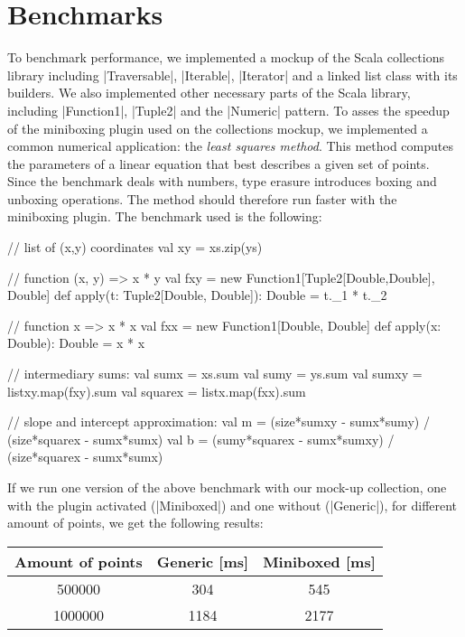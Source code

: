 \section{Benchmarks}

To benchmark performance, we implemented a mockup of the Scala collections library including |Traversable|, |Iterable|, |Iterator| and a linked list class with its builders. We also implemented other necessary parts of the Scala library, including |Function1|, |Tuple2| and the |Numeric| pattern. To asses the speedup of the miniboxing plugin used on the collections mockup, we implemented a common numerical application: the \textit{least squares method}. This method computes the parameters of a linear equation that best describes a given set of points. Since the benchmark deals with numbers, type erasure introduces boxing and unboxing operations. The method should therefore run faster with the miniboxing plugin. The benchmark used is the following:

\begin{lstlisting-nobreak}
 // list of (x,y) coordinates
 val xy = xs.zip(ys)

 // function (x, y) => x * y
 val fxy =
   new Function1[Tuple2[Double,Double], Double] {
     def apply(t: Tuple2[Double, Double]): Double = t._1 * t._2
   }

 // function x => x * x
 val fxx =
   new Function1[Double, Double] {
     def apply(x: Double): Double = x * x
   }

 // intermediary sums:
 val sumx  = xs.sum
 val sumy  = ys.sum
 val sumxy = listxy.map(fxy).sum
 val squarex = listx.map(fxx).sum

 // slope and intercept approximation:
 val m = (size*sumxy - sumx*sumy) / (size*squarex - sumx*sumx)
 val b = (sumy*squarex - sumx*sumxy) / (size*squarex - sumx*sumx)
\end{lstlisting-nobreak}
%

If we run one version of the above benchmark with our mock-up collection, one with the plugin activated (|Miniboxed|) and one without (|Generic|), for different amount of points, we get the following results:

\begin{center}
\begin{tabular}{ |c|c|c| }
 \hline
 Amount of points & Generic [ms] & Miniboxed [ms] \\
 \hline
 500000 & 304 & 545 \\
1000000 & 1184 & 2177 \\
 \hline
\end{tabular}
\end{center}

